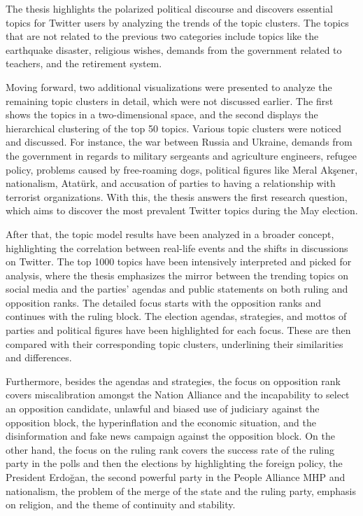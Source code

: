 The thesis highlights the polarized political discourse and discovers essential topics for Twitter 
users by analyzing the trends of the topic clusters. The topics that are not related to the previous 
two categories include topics like the earthquake disaster, religious wishes, demands from the 
government related to teachers, and the retirement system.

Moving forward, two additional visualizations were presented to analyze the remaining topic clusters 
in detail, which were not discussed earlier. The first shows the topics in a two-dimensional space, 
and the second displays the hierarchical clustering of the top 50 topics. Various topic clusters were 
noticed and discussed. For instance, the war between Russia and Ukraine, demands from the government 
in regards to military sergeants and agriculture engineers, refugee policy, problems caused by 
free-roaming dogs, political figures like Meral Akşener, nationalism, Atatürk, and accusation of 
parties to having a relationship with terrorist organizations. With this, the thesis answers the first 
research question, which aims to discover the most prevalent Twitter topics during the May election.

After that, the topic model results have been analyzed in a broader concept, highlighting the 
correlation between real-life events and the shifts in discussions on Twitter. The top 1000 topics 
have been intensively interpreted and picked for analysis, where the thesis emphasizes the mirror 
between the trending topics on social media and the parties' agendas and public statements on both 
ruling and opposition ranks. The detailed focus starts with the opposition ranks and continues with 
the ruling block. The election agendas, strategies, and mottos of parties and political figures have 
been highlighted for each focus. These are then compared with their corresponding topic clusters, 
underlining their similarities and differences. 

Furthermore, besides the agendas and strategies, the focus on opposition rank covers miscalibration 
amongst the Nation Alliance and the incapability to select an opposition candidate, unlawful and 
biased use of judiciary against the opposition block, the hyperinflation and the economic situation, 
and the disinformation and fake news campaign against the opposition block. On the other hand, the 
focus on the ruling rank covers the success rate of the ruling party in the polls and then the 
elections by highlighting the foreign policy, the President Erdoğan, the second powerful party in 
the People Alliance \ac{MHP} and nationalism,  the problem of the merge of the state and the ruling 
party, emphasis on religion, and the theme of continuity and stability.


